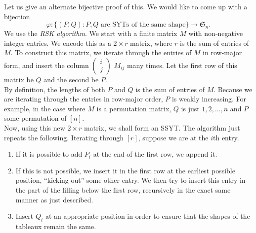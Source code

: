 	Let us give an alternate bijective proof of this.
	We would like to come up with a bijection 
	\[ \varphi : \{(P,Q) : P,Q \text{ are SYTs of the same shape}\} \to \mathfrak{S}_n. \]
	We use the \emph{RSK algorithm}. We start with a finite matrix $M$ with non-negative integer entries. We encode this as a $2 \times r$ matrix, where $r$ is the sum of entries of $M$. To construct this matrix, we iterate through the entries of $M$ in row-major form, and insert the column $\begin{pmatrix} i \\ j \end{pmatrix}$ $M_{ij}$ many times. Let the first row of this matrix be $Q$ and the second be $P$.\\
	By definition, the lengths of both $P$ and $Q$ is the sum of entries of $M$. Because we are iterating through the entries in row-major order, $P$ is weakly increasing. For example, in the case where $M$ is a permutation matrix, $Q$ is just $1,2,\ldots,n$ and $P$ some permutation of $[n]$.\\
	Now, using this new $2 \times r$ matrix, we shall form an SSYT. The algorithm just repeats the following. Iterating through $[r]$, suppose we are at the $i$th entry.
	\begin{enumerate}
		\item If it is possible to add $P_i$ at the end of the first row, we append it.
		\item If this is not possible, we insert it in the first row at the earliest possible position, ``kicking out'' some other entry. We then try to insert this entry in the part of the filling below the first row, recursively in the exact same manner as just described.
		\item Insert $Q_i$ at an appropriate position in order to ensure that the shapes of the tableaux remain the same.
	\end{enumerate}

